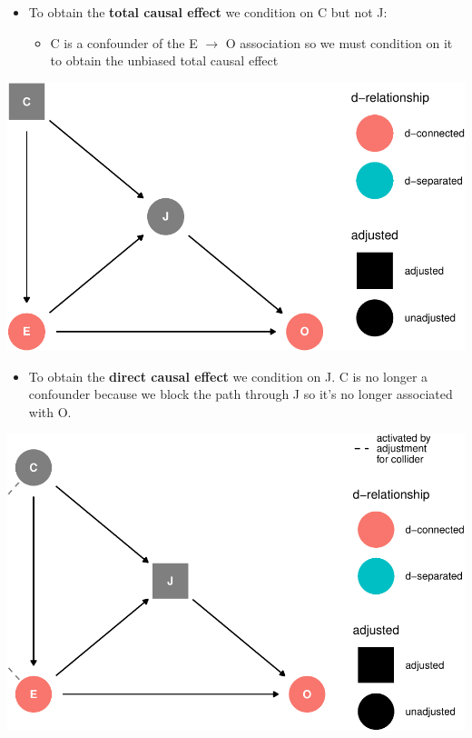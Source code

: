 \documentclass[
]{article}
\providecommand{\tightlist}{%
  \setlength{\itemsep}{0pt}\setlength{\parskip}{0pt}}
\begin{document}
\begin{itemize}
\item
  To obtain the \textbf{total causal effect} we condition on C but not
  J:

  \begin{itemize}
  \tightlist
  \item
    C is a confounder of the E \(\to\) O association so we must
    condition on it to obtain the unbiased total causal effect
  \end{itemize}
\end{itemize}

\includegraphics{index_files/figure-latex/adjust C ex2-1.pdf}

\begin{itemize}
\tightlist
\item
  To obtain the \textbf{direct causal effect} we condition on J. C is no
  longer a confounder because we block the path through J so it's no
  longer associated with O.
\end{itemize}

\includegraphics{index_files/figure-latex/adjust J ex2-1.pdf}
\end{document}
